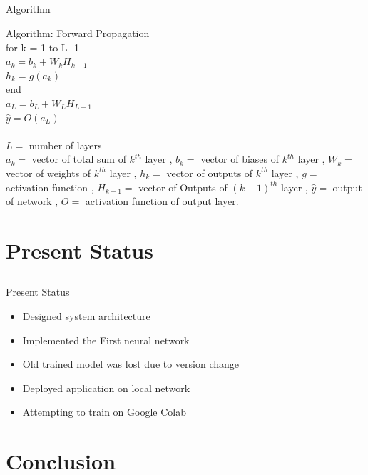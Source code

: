 \documentclass{beamer}
\begin{document}
\subsection{}
\begin{frame}{Algorithm}
\begin{block}{}
Algorithm: Forward Propagation\\
for k = 1 to L -1\\
\quad \quad $a_{k} = b_{k} + W_{k} H_{k - 1}$\\
\quad \quad $h_{k} = g(a_{k})$\\
end\\
$a_{L} = b_{L} + W_{L}H_{L-1}$\\
$\hat y = O(a_{L})$\\
\quad\\
$L = $ number of layers\\
$a_{k} = $ vector of total sum of $k^{th}$ layer , 
$b_{k} = $ vector of biases of $k^{th}$ layer , 
$W_{k} = $ vector of weights of $k^{th}$ layer , 
$h_{k} = $ vector of outputs of $k^{th}$ layer , 
$g = $ activation function , 
$H_{k-1} = $ vector of Outputs of $(k-1)^{th}$ layer , 
$\hat y = $ output of network , 
$O = $ activation function of output layer.
\end{block}
\end{frame}


\section{Present Status}
\subsection{}
\begin{frame}{Present Status}
\begin{itemize}
\item{Designed system architecture}
\item{Implemented the First neural network}
\item{Old trained model was lost due to version change}
\item{Deployed application on local network}
\item{Attempting to train on Google Colab}
\end{itemize}
\end{frame}


\section{Conclusion}
\end{document}

